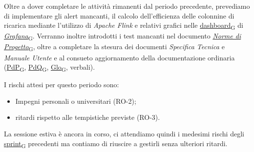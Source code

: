 Oltre a dover completare le attività rimanenti dal periodo precedente, prevediamo di implementare gli alert mancanti, il calcolo dell'efficienza delle colonnine di ricarica mediante l'utilizzo di \textit{Apache Flink} e relativi grafici nelle \href{https://7last.github.io/docs/pb/documentazione-interna/glossario\#dashboard}{dashboard\textsubscript{G}} di \href{https://7last.github.io/docs/pb/documentazione-interna/glossario\#grafana}{\textit{Grafana}\textsubscript{G}}. Verranno inoltre introdotti i test mancanti nel documento \href{https://7last.github.io/docs/pb/documentazione-interna/glossario\#norme-di-progetto}{\textit{Norme di Progetto}\textsubscript{G}}, oltre a completare la stesura dei documenti \textit{Specifica Tecnica} e \textit{Manuale Utente} e al consueto aggiornamento della documentazione ordinaria (\href{https://7last.github.io/docs/pb/documentazione-interna/glossario\#piano-di-progetto}{PdP\textsubscript{G}}, \href{https://7last.github.io/docs/pb/documentazione-interna/glossario\#piano-di-qualifica}{PdQ\textsubscript{G}}, \href{https://7last.github.io/docs/pb/documentazione-interna/glossario\#glossario}{Glo\textsubscript{G}}, verbali).

I rischi attesi per questo periodo sono:
\begin{itemize}
    \item Impegni personali o universitari (RO-2);
	\item ritardi rispetto alle tempistiche previste (RO-3).
\end{itemize}
La sessione estiva è ancora in corso, ci attendiamo quindi i medesimi rischi degli \href{https://7last.github.io/docs/pb/documentazione-interna/glossario\#sprint}{sprint\textsubscript{G}} precedenti ma contiamo di riuscire a gestirli senza ulteriori ritardi.

